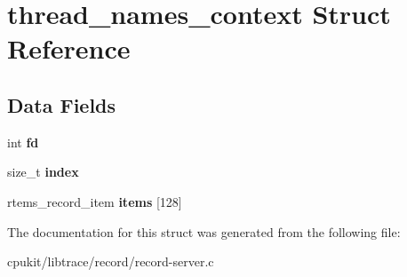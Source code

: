 \hypertarget{structthread__names__context}{}\section{thread\+\_\+names\+\_\+context Struct Reference}
\label{structthread__names__context}
\subsection*{Data Fields}
\begin{DoxyCompactItemize}
\item 
\mbox{\label{structthread__names__context_a48b7d6b05d9ce412f397d80a1b650334}} 
int {\bfseries fd}
\item 
\mbox{\label{structthread__names__context_a99aa5ec798b49c6cb19f3d0c8f4ead9a}} 
size\+\_\+t {\bfseries index}
\item 
\mbox{\label{structthread__names__context_a9c78b1bcbc7c2be7e4f11d5aab1388b7}} 
rtems\+\_\+record\+\_\+item {\bfseries items} \mbox{[}128\mbox{]}
\end{DoxyCompactItemize}


The documentation for this struct was generated from the following file\+:\begin{DoxyCompactItemize}
\item 
cpukit/libtrace/record/record-\/server.\+c\end{DoxyCompactItemize}
